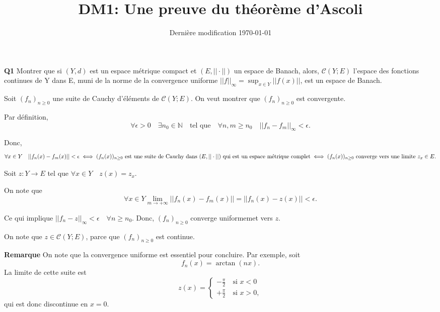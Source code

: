 \documentclass[french]{article}
\begin{document}
	\title{DM1: Une preuve du théorème d'Ascoli}
	\date{Dernière modification \today}
	
	\maketitle
	
	\begin{tcolorbox}[colback=gray!5!white,colframe=gray!75!black]
		\textbf{\large{Q1}} Montrer que si $(Y,d)$ est un espace métrique compact et $(E,||\cdot||)$ un espace de Banach, alors, $\mathcal{C}(Y;E)$ l'espace des fonctions continues de Y dans E, muni de la norme de la convergence uniforme $||f||_{\infty} = \sup_{x \in Y} ||f(x)||$, est un espace de Banach.
	\end{tcolorbox}

	Soit $(f_n)_{n \geq 0}$ une suite de Cauchy d'éléments de $\mathcal{C}(Y;E)$. On veut montrer que $(f_n)_{n \geq 0}$ est convergente.
	
	Par définition, \[ \forall \epsilon > 0 \quad \exists n_0 \in \mathbb{N} \quad \text{tel que} \quad  \forall n,m \geq n_0 \quad ||f_n - f_m||_{\infty} < \epsilon.\]
	
	Donc,	
	\begin{dmath*}
		\forall x \in Y \quad ||f_n(x) - f_m(x)|| < \epsilon \\ \iff  \text{$(f_n(x))_{n \geq 0}$ est une suite de Cauchy dans $(E, ||\cdot||)$ qui est un espace métrique complet} \\ \iff \text{$(f_n(x))_{n \geq 0}$ converge vers une limite $z_x \in E$}.
	\end{dmath*}
	
	Soit $z : Y \to E$ tel que $\forall x \in Y \quad z(x) = z_x$.
	
	On note que \[\forall x \in Y \lim_{m \to +\infty} ||f_n(x) - f_m(x)|| = ||f_n(x) - z(x)|| < \epsilon.\]
	
	Ce qui implique $||f_n - z||_{\infty} < \epsilon  \quad \forall n \geq n_0$. Donc, $(f_n)_{n \geq 0}$ converge uniformemet vers $z$.
	
	On note que $z \in \mathcal{C}(Y;E)$, parce que $(f_n)_{n \geq 0}$ est continue.
	
	\begin{tcolorbox}[colback=green!5!white,colframe=green!75!black]
		\textbf{Remarque} On note que la convergence uniforme est essentiel pour concluire. Par exemple, soit 
		\[f_n(x) = \arctan(nx).\]
		La limite de cette suite est 
		\begin{equation}
			z(x) = 
			\begin{cases}
				-\frac{\pi}{2} \quad \text{si $x < 0$}\\
				+\frac{\pi}{2} \quad \text{si $x > 0$},
			\end{cases}
		\end{equation}
		qui est donc discontinue en $x = 0$.
	\end{tcolorbox}
	 
\end{document}
